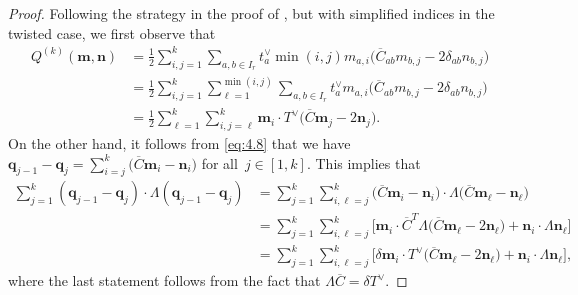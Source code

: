 \documentclass[pdftex]{sigma}
\numberwithin{equation}{section}
\begin{document}
\begin{proof}
Following the strategy in the proof of \cite[Lemma 4.2]{Lin21}, but with simplified indices in the twisted case, we first observe that
\begin{align*}
Q^{(k)}(\mathbf{m},\mathbf{n})
&=\frac{1}{2}\sum_{i,j=1}^k\sum_{a,b\in I_r} t_a^{\vee}\min(i,j)m_{a,i}\bigl(\overline{C}_{a b}m_{b,j}-2\delta_{ab}n_{b,j}\bigr)\\
&=\frac{1}{2}\sum_{i,j=1}^k\sum_{\ell=1}^{\min(i,j)}\sum_{ a,b\in I_r}t_a^{\vee}m_{a,i}\bigl(\overline{C}_{ab}m_{b,j}-2\delta_{ab}n_{b,j}\bigr)\\
&=\frac{1}{2}\sum_{\ell=1}^k\sum_{i,j=\ell}^k\mathbf{m}_i\cdot T^{\vee}\bigl(\overline{C}\mathbf{m}_j-2\mathbf{n}_j\bigr).
\end{align*}
On the other hand, it follows from \eqref{eq:4.8} that we have
$
\mathbf{q}_{j-1}-\mathbf{q}_j =\sum_{i=j}^k\bigl(\overline{C}\mathbf{m}_i-\mathbf{n}_i\bigr)
$
for all~${j\in[1,k]}$. This implies that
\begin{align*}
\sum_{j=1}^k(\mathbf{q}_{j-1}-\mathbf{q}_j)\cdot \Lambda(\mathbf{q}_{j-1}-\mathbf{q}_j)
&=\sum_{j=1}^k\sum_{i,\ell=j}^k\bigl(\overline{C}\mathbf{m}_i-\mathbf{n}_i\bigr)\cdot\Lambda\bigl(\overline{C}\mathbf{m}_{\ell}-\mathbf{n}_{\ell}\bigr)\\
&=\sum_{j=1}^k\sum_{i,\ell=j}^k\bigl[\mathbf{m}_i\cdot \overline{C}^T\Lambda\bigl(\overline{C}\mathbf{m}_{\ell}-2\mathbf{n}_{\ell}\bigr)+\mathbf{n}_i\cdot\Lambda\mathbf{n}_{\ell}\bigr]\\
&=\sum_{j=1}^k\sum_{i,\ell=j}^k\bigl[\delta\mathbf{m}_i\cdot T^{\vee}\bigl(\overline{C}\mathbf{m}_{\ell}-2\mathbf{n}_{\ell}\bigr) +\mathbf{n}_i\cdot\Lambda\mathbf{n}_{\ell}\bigr],
\end{align*}
where the last statement follows from the fact that $\Lambda\overline{C}=\delta T^{\vee}$.
\end{proof}
\end{document}
